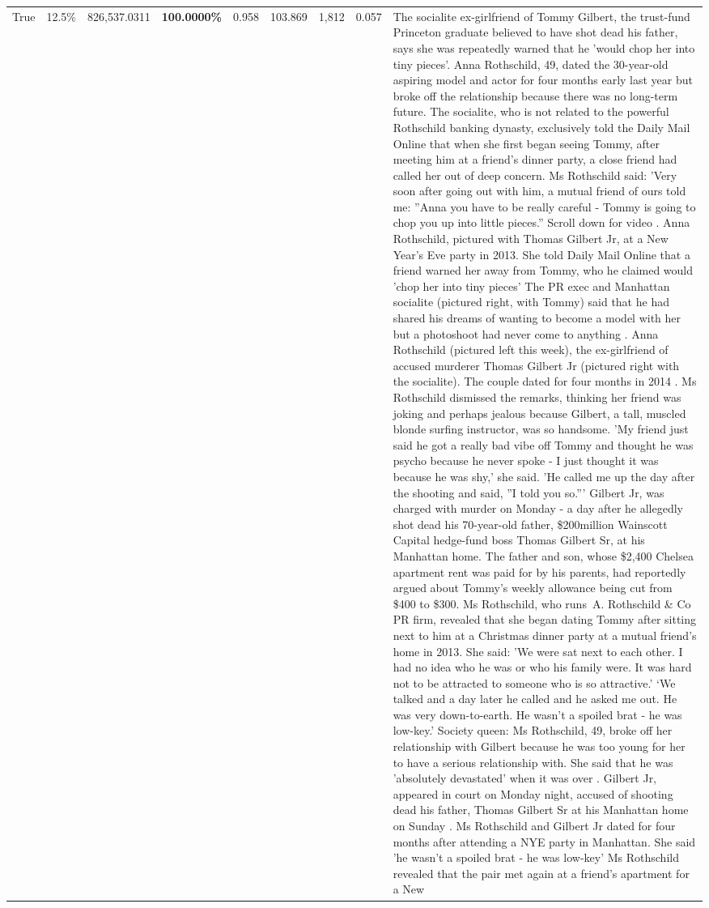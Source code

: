 \begin{table}[H]
\begin{tabular}{lllrlllll}
True & 12.5\% & 826,537.0311 & \bfseries \color{red} 100.0000\% & 0.958 & 103.869 & 1,812 & 0.057 & The socialite ex-girlfriend of Tommy Gilbert, the trust-fund Princeton graduate believed to have shot dead his father, says she was repeatedly warned that he 'would chop her into tiny pieces'. Anna Rothschild, 49, dated the 30-year-old aspiring model and actor for four months early last year but broke off the relationship because there was no long-term future. The socialite, who is not related to the powerful Rothschild banking dynasty, exclusively told the Daily Mail Online that when she first began seeing Tommy, after meeting him at a friend's dinner party, a close friend had called her out of deep concern. Ms Rothschild said: 'Very soon after going out with him, a mutual friend of ours told me: ''Anna you have to be really careful - Tommy is going to chop you up into little pieces.'' Scroll down for video . Anna Rothschild, pictured with Thomas Gilbert Jr, at a New Year's Eve party in 2013. She told Daily Mail Online that a friend warned her away from Tommy, who he claimed would 'chop her into tiny pieces' The PR exec and Manhattan socialite (pictured right, with Tommy) said that he had shared his dreams of wanting to become a model with her but a photoshoot had never come to anything . Anna Rothschild (pictured left this week), the ex-girlfriend of accused murderer Thomas Gilbert Jr (pictured right with the socialite). The couple dated for four months in 2014 . Ms Rothschild dismissed the remarks, thinking her friend was joking and perhaps jealous because Gilbert, a tall, muscled blonde surfing instructor, was so handsome. 'My friend just said he got a really bad vibe off Tommy and thought he was psycho because he never spoke - I just thought it was because he was shy,' she said. 'He called me up the day after the shooting and said, ''I told you so.''' Gilbert Jr, was charged with murder on Monday - a day after he allegedly shot dead his 70-year-old father, \$200million Wainscott Capital hedge-fund boss Thomas Gilbert Sr, at his Manhattan home. The father and son, whose \$2,400 Chelsea apartment rent was paid for by his parents, had reportedly argued about Tommy's weekly allowance being cut from \$400 to \$300. Ms Rothschild, who runs A. Rothschild \& Co PR firm, revealed that she began dating Tommy after sitting next to him at a Christmas dinner party at a mutual friend's home in 2013. She said: 'We were sat next to each other. I had no idea who he was or who his family were. It was hard not to be attracted to someone who is so attractive.' ‘We talked and a day later he called and he asked me out. He was very down-to-earth. He wasn’t a spoiled brat - he was low-key.’ Society queen: Ms Rothschild, 49, broke off her relationship with Gilbert because he was too young for her to have a serious relationship with. She said that he was 'absolutely devastated' when it was over . Gilbert Jr, appeared in court on Monday night, accused of shooting dead his father, Thomas Gilbert Sr at his Manhattan home on Sunday . Ms Rothschild and Gilbert Jr dated for four months after attending a NYE party in Manhattan. She said 'he wasn't a spoiled brat - he was low-key' Ms Rothschild revealed that the pair met again at a friend’s apartment for a New 
\end{tabular}
\end{table}
